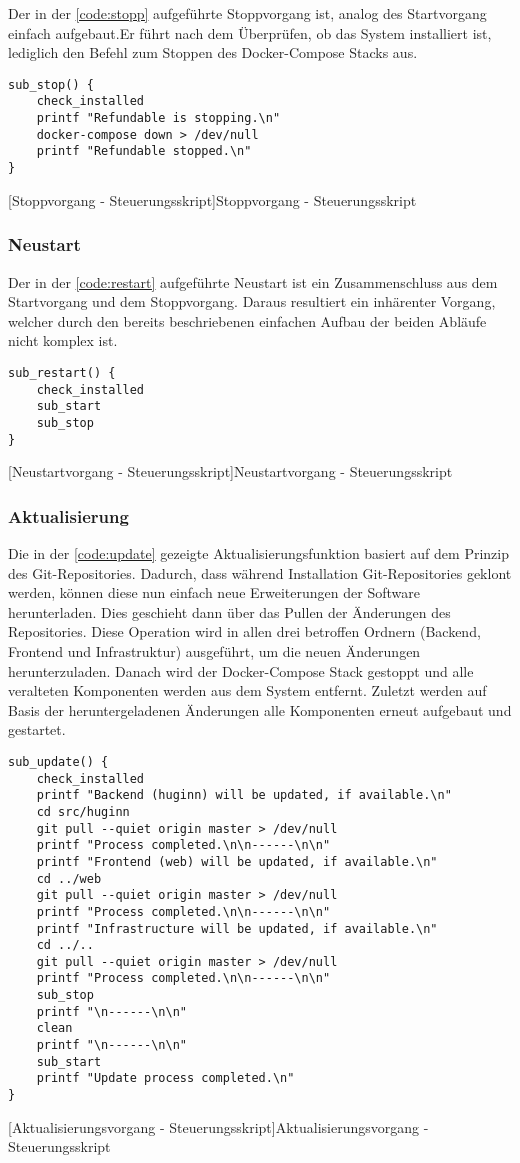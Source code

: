 Der in der \autoref{code:stopp} aufgeführte Stoppvorgang ist, analog des Startvorgang einfach aufgebaut.Er führt nach dem Überprüfen, ob das System installiert ist, lediglich den Befehl zum Stoppen des Docker-Compose Stacks aus.

\begin{verbatim}
sub_stop() {
	check_installed
	printf "Refundable is stopping.\n"
	docker-compose down > /dev/null
	printf "Refundable stopped.\n"
}
\end{verbatim}
[Stoppvorgang - Steuerungsskript]{Stoppvorgang - Steuerungsskript}
\label{code:stopp}

\subsubsection{Neustart}

Der in der \autoref{code:restart} aufgeführte Neustart ist ein Zusammenschluss aus dem Startvorgang und dem Stoppvorgang. Daraus resultiert ein inhärenter Vorgang, welcher durch den bereits beschriebenen einfachen Aufbau der beiden Abläufe nicht komplex ist.

\begin{verbatim}
sub_restart() {
	check_installed
	sub_start
	sub_stop
}
\end{verbatim}
[Neustartvorgang - Steuerungsskript]{Neustartvorgang - Steuerungsskript}
\label{code:restart}

\subsubsection{Aktualisierung}
Die in der \autoref{code:update} gezeigte Aktualisierungsfunktion basiert auf dem Prinzip des Git-Repositories. Dadurch, dass während Installation Git-Repositories geklont werden, können diese nun einfach neue Erweiterungen der Software herunterladen. Dies geschieht dann über das Pullen der Änderungen des Repositories. Diese Operation wird in allen drei betroffen Ordnern (Backend, Frontend und Infrastruktur) ausgeführt, um die neuen Änderungen herunterzuladen. Danach wird der Docker-Compose Stack gestoppt und alle veralteten Komponenten werden aus dem System entfernt. Zuletzt werden auf Basis der heruntergeladenen Änderungen alle Komponenten erneut aufgebaut und gestartet.

\newpage

\begin{verbatim}
sub_update() {
	check_installed
	printf "Backend (huginn) will be updated, if available.\n"
	cd src/huginn
	git pull --quiet origin master > /dev/null
	printf "Process completed.\n\n------\n\n"
	printf "Frontend (web) will be updated, if available.\n"
	cd ../web
	git pull --quiet origin master > /dev/null
	printf "Process completed.\n\n------\n\n"
	printf "Infrastructure will be updated, if available.\n"
	cd ../..
	git pull --quiet origin master > /dev/null
	printf "Process completed.\n\n------\n\n"
	sub_stop
	printf "\n------\n\n"
	clean
	printf "\n------\n\n"
	sub_start
	printf "Update process completed.\n"
}
\end{verbatim}
[Aktualisierungsvorgang - Steuerungsskript]{Aktualisierungsvorgang - Steuerungsskript}
\label{code:update}

